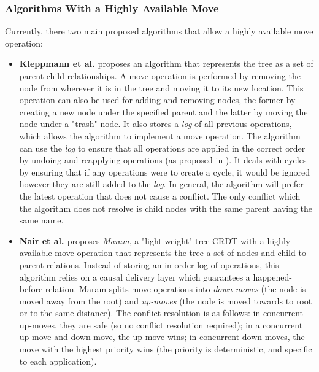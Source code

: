 \documentclass[12pt]{article}
\begin{document}
\subsubsection{Algorithms With a Highly Available Move} \label{sssec:algorithms}
Currently, there two main proposed algorithms that allow a highly available move operation:
\begin{itemize}
    \item
          \textbf{Kleppmann et al. \cite{9563274}} proposes an algorithm that represents the tree as a set of parent-child relationships. A move operation is performed by removing the node from wherever it is in the tree and moving it to its new location. This operation can also be used for adding and removing nodes, the former by creating a new node under the specified parent and the latter by moving the node under a "trash" node. It also stores a \textit{log} of all previous operations, which allows the algorithm to implement a move operation. The algorithm can use the \textit{log} to ensure that all operations are applied in the correct order by undoing and reapplying operations (as proposed in \cite{https://doi.org/10.48550/arxiv.1805.04263}). It deals with cycles by ensuring that if any operations were to create a cycle, it would be ignored however they are still added to the \textit{log}. In general, the algorithm will prefer the latest operation that does not cause a conflict. The only conflict which the algorithm does not resolve is child nodes with the same parent having the same name.

    \item
          \textbf{Nair et al. \cite{https://doi.org/10.48550/arxiv.2103.04828}} proposes \textit{Maram}, a "light-weight" tree CRDT with a highly available move operation that represents the tree a set of nodes and child-to-parent relations. Instead of storing an in-order log of operations, this algorithm relies on a causal delivery layer which guarantees
          a happened-before relation. Maram splits move operations into \textit{down-moves} (the node is moved away from the root) and \textit{up-moves} (the node is moved towards to root or to the same distance). The conflict resolution is as follows: in concurrent up-moves, they are safe (so no conflict resolution required); in a concurrent up-move and down-move, the up-move wins; in concurrent down-moves, the move with the highest priority wins (the priority is deterministic, and specific to each application).

\end{itemize}
  
\end{document}

